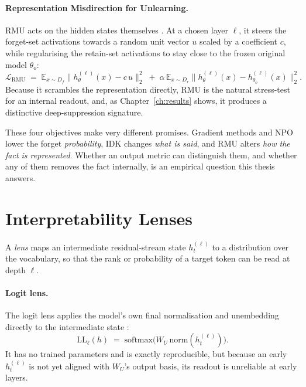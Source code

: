 \paragraph{Representation Misdirection for Unlearning.}
RMU acts on the hidden states themselves \citep{li2024wmdp}. At a chosen layer $\ell$, it steers the
forget-set activations towards a random unit vector $u$ scaled by a coefficient $c$, while regularising
the retain-set activations to stay close to the frozen original model $\theta_o$:
\begin{equation}
  \mathcal{L}_{\mathrm{RMU}} \;=\; \mathbb{E}_{x\sim D_f}\bigl\| h^{(\ell)}_\theta(x) - c\,u \bigr\|_2^2
  \;+\; \alpha\,\mathbb{E}_{x\sim D_r}\bigl\| h^{(\ell)}_\theta(x) - h^{(\ell)}_{\theta_o}(x) \bigr\|_2^2.
  \label{eq:rmu}
\end{equation}
Because it scrambles the representation directly, RMU is the natural stress-test for an internal readout,
and, as Chapter~\ref{ch:results} shows, it produces a distinctive deep-suppression signature.

These four objectives make very different promises. Gradient methods and NPO lower the forget
\emph{probability}, IDK changes \emph{what is said}, and RMU alters \emph{how the fact is represented}.
Whether an output metric can distinguish them, and whether any of them removes the fact internally, is an
empirical question this thesis answers.

\section{Interpretability Lenses}
\label{sec:bg-lenses}

A \emph{lens} maps an intermediate residual-stream state $h^{(\ell)}_t$ to a distribution over the
vocabulary, so that the rank or probability of a target token can be read at depth $\ell$.

\paragraph{Logit lens.}
The logit lens applies the model's own final normalisation and unembedding directly to the intermediate
state \citep{nostalgebraist2020logitlens}:
\begin{equation}
  \mathrm{LL}_\ell(h) \;=\; \mathrm{softmax}\bigl(W_U\,\mathrm{norm}(h^{(\ell)}_t)\bigr).
  \label{eq:logitlens}
\end{equation}
It has no trained parameters and is exactly reproducible, but because an early $h^{(\ell)}_t$ is not yet
aligned with $W_U$'s output basis, its readout is unreliable at early layers.

